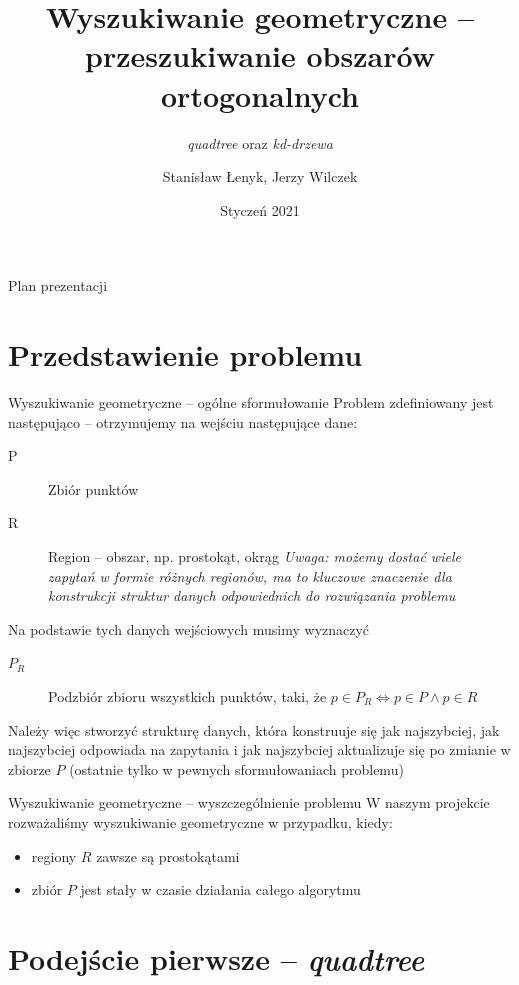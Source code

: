 \documentclass{beamer}
\title{\textbf{Wyszukiwanie geometryczne -- przeszukiwanie obszarów ortogonalnych}}
\subtitle{\textit{quadtree} oraz \textit{kd-drzewa}}
\author{Stanisław Łenyk, Jerzy Wilczek}
\institute{Algorytmy geometryczne -- projekt}
\date{Styczeń 2021}
\begin{document}
\begin{frame}
    \titlepage
\end{frame}

\begin{frame}{Plan prezentacji}
    \tableofcontents
\end{frame}

\section{Przedstawienie problemu}

\begin{frame}{Wyszukiwanie geometryczne -- ogólne sformułowanie}
    Problem zdefiniowany jest następująco -- otrzymujemy na wejściu następujące dane:
    \begin{description}
        \item[P] Zbiór punktów
        \item[R] Region -- obszar, np. prostokąt, okrąg \textit{Uwaga: możemy dostać wiele zapytań w formie różnych regionów, ma to kluczowe znaczenie dla konstrukcji struktur danych odpowiednich do rozwiązania problemu}
    \end{description}
    \pause
    Na podstawie tych danych wejściowych musimy wyznaczyć
    \begin{description}
        \item[$P_R$] Podzbiór zbioru wszystkich punktów, taki, że $p \in P_R \iff p \in P \land p \in R$
    \end{description}
    \pause
    Należy więc stworzyć strukturę danych, która konstruuje się jak najszybciej, jak najszybciej odpowiada na zapytania i jak najszybciej aktualizuje się po zmianie w zbiorze $P$ (ostatnie tylko w pewnych sformułowaniach problemu) 
\end{frame}

\begin{frame}{Wyszukiwanie geometryczne -- wyszczególnienie problemu}
    W naszym projekcie rozważaliśmy wyszukiwanie geometryczne w przypadku, kiedy:
    \begin{itemize}
        \item<2-> regiony $R$ zawsze są prostokątami
        \item<3-> zbiór $P$ jest stały w czasie działania całego algorytmu
    \end{itemize}
\end{frame}

\section{Podejście pierwsze -- \textit{quadtree}}
\end{document}
